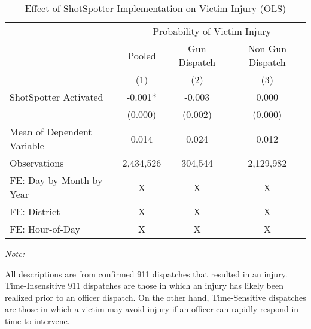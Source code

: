 \begin{table}[H]

\caption{\label{victim_table}Effect of ShotSpotter Implementation on Victim Injury (OLS)}
\centering
\begin{threeparttable}
\fontsize{11}{13}\selectfont
\begin{tabular}[t]{>{\raggedright\arraybackslash}p{8cm}ccc}
\toprule
\multicolumn{1}{c}{ } & \multicolumn{3}{c}{Probability of Victim Injury} \\
\cmidrule(l{3pt}r{3pt}){2-4}
\multicolumn{1}{c}{ } & \multicolumn{1}{c}{Pooled} & \multicolumn{1}{c}{Gun Dispatch} & \multicolumn{1}{c}{Non-Gun Dispatch} \\
\cmidrule(l{3pt}r{3pt}){2-2} \cmidrule(l{3pt}r{3pt}){3-3} \cmidrule(l{3pt}r{3pt}){4-4}
  & (1) & (2) & (3)\\
\midrule
ShotSpotter Activated & -0.001* & -0.003 & 0.000\\
 & (0.000) & (0.002) & (0.000)\\
Mean of Dependent Variable & 0.014 & 0.024 & 0.012\\
Observations & 2,434,526 & 304,544 & 2,129,982\\
FE: Day-by-Month-by-Year & X & X & X\\
\addlinespace
FE: District & X & X & X\\
FE: Hour-of-Day & X & X & X\\
\bottomrule
\end{tabular}
\begin{tablenotes}
\item \textit{Note: } 
\item All descriptions are from confirmed 911 dispatches that resulted                       in an injury. Time-Insensitive 911 dispatches are those in which                       an injury has likely been realized prior to an officer dispatch.                       On the other hand, Time-Sensitive dispatches are those in which                       a victim may avoid injury if an officer can rapidly respond in time                       to intervene.                   
\end{tablenotes}
\end{threeparttable}
\end{table}
